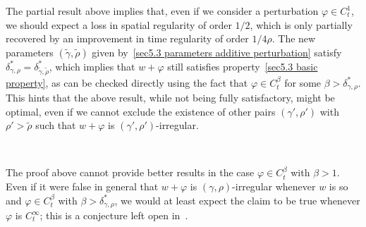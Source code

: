 \documentclass[10pt]{article}
\begin{document}
The partial result above implies that, even if we consider a perturbation
$\varphi \in C^1_t$, we should expect a loss in spatial regularity of order $1
/ 2$, which is only partially recovered by an improvement in time regularity
of order $1 / 4 \rho$. The new parameters $(\tilde{\gamma}, \tilde{\rho})$
given by~{\eqref{sec5.3 parameters additive perturbation}} satisfy
$\delta^{\ast}_{\gamma, \rho} = \delta^{\ast}_{\tilde{\gamma}, \tilde{\rho}}$,
which implies that $w + \varphi$ still satisfies property~{\eqref{sec5.3 basic
property}}, as can be checked directly using the fact that $\varphi \in
C^{\beta}_t$ for some $\beta > \delta^{\ast}_{\gamma, \rho}$. This hints that
the above result, while not being fully satisfactory, might be optimal, even
if we cannot exclude the existence of other pairs $(\gamma', \rho')$ with
$\rho' > \tilde{\rho}$ such that $w + \varphi$ is $(\gamma',
\rho')$\mbox{-}irregular.

\

The proof above cannot provide better results in the case $\varphi \in
C^{\beta}_t$ with $\beta > 1$. Even if it were false in general that $w +
\varphi$ is $(\gamma, \rho)$-irregular whenever $w$ is so and $\varphi \in
C^{\beta}_t$ with $\beta > \delta^{\ast}_{\gamma, \rho}$, we would at least
expect the claim to be true whenever $\varphi$ is $C^{\infty}_t$; this is a
conjecture left open in~{\cite{catelliergubinelli}}.
\end{document}
